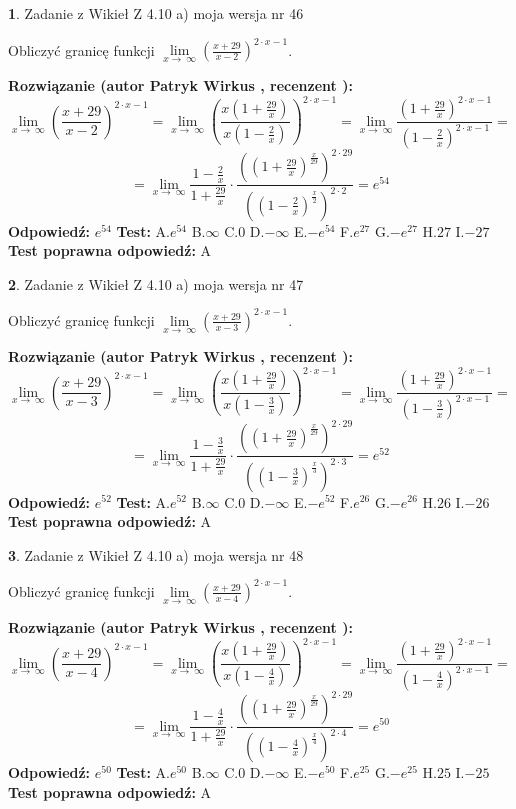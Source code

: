 \documentclass[12pt, a4paper]{article}
\theoremstyle{definition} %
\newtheorem{zad}{}
\newcommand{\zadStart}[1]{\begin{zad}#1\newline}
\newcommand{\zadStop}{\end{zad}}
\newcommand{\rozwStart}[2]{\noindent \textbf{Rozwiązanie (autor #1 , recenzent #2): }\newline}
\newcommand{\rozwStop}{\newline}
\newcommand{\odpStart}{\noindent \textbf{Odpowiedź:}\newline}
\newcommand{\odpStop}{\newline}
\newcommand{\testStart}{\noindent \textbf{Test:}\newline}
\newcommand{\testStop}{\newline}
\newcommand{\kluczStart}{\noindent \textbf{Test poprawna odpowiedź:}\newline}
\newcommand{\kluczStop}{\newline}
\begin{document}
\zadStart{Zadanie z Wikieł Z 4.10 a) moja wersja nr 46}

Obliczyć granicę funkcji  $\lim\limits_{x\to\ \infty}(\frac{x+29}{x-2})^{2\cdot x-1}$.
\zadStop
\rozwStart{Patryk Wirkus}{}
$$\lim\limits_{x\to\ \infty}(\frac{x+29}{x-2})^{2\cdot x-1} = \lim\limits_{x\to\ \infty}(\frac{x(1+\frac{29}{x})}{x(1-\frac{2}{x})})^{2\cdot x-1}=\lim\limits_{x\to\ \infty}\frac{(1+\frac{29}{x})^{2\cdot x-1}}{(1-\frac{2}{x})^{2\cdot x-1}}=$$
$$=\lim\limits_{x\to\ \infty}\frac{1-\frac{2}{x}}{1+\frac{29}{x}}\cdot\frac{((1+\frac{29}{x})^{\frac{x}{29}})^{2\cdot29}}{((1-\frac{2}{x})^{\frac{x}{2}})^{2\cdot2}}=e^{54}$$
\rozwStop
\odpStart
$e^{54}$
\odpStop
\testStart
A.$e^{54}$ B.$\infty$ C.$0$ D.$-\infty$ E.$-e^{54}$
F.$e^{27}$ G.$-e^{27}$
H.$27$
I.$-27$
\testStop
\kluczStart
A
\kluczStop



\zadStart{Zadanie z Wikieł Z 4.10 a) moja wersja nr 47}

Obliczyć granicę funkcji  $\lim\limits_{x\to\ \infty}(\frac{x+29}{x-3})^{2\cdot x-1}$.
\zadStop
\rozwStart{Patryk Wirkus}{}
$$\lim\limits_{x\to\ \infty}(\frac{x+29}{x-3})^{2\cdot x-1} = \lim\limits_{x\to\ \infty}(\frac{x(1+\frac{29}{x})}{x(1-\frac{3}{x})})^{2\cdot x-1}=\lim\limits_{x\to\ \infty}\frac{(1+\frac{29}{x})^{2\cdot x-1}}{(1-\frac{3}{x})^{2\cdot x-1}}=$$
$$=\lim\limits_{x\to\ \infty}\frac{1-\frac{3}{x}}{1+\frac{29}{x}}\cdot\frac{((1+\frac{29}{x})^{\frac{x}{29}})^{2\cdot29}}{((1-\frac{3}{x})^{\frac{x}{3}})^{2\cdot3}}=e^{52}$$
\rozwStop
\odpStart
$e^{52}$
\odpStop
\testStart
A.$e^{52}$ B.$\infty$ C.$0$ D.$-\infty$ E.$-e^{52}$
F.$e^{26}$ G.$-e^{26}$
H.$26$
I.$-26$
\testStop
\kluczStart
A
\kluczStop



\zadStart{Zadanie z Wikieł Z 4.10 a) moja wersja nr 48}

Obliczyć granicę funkcji  $\lim\limits_{x\to\ \infty}(\frac{x+29}{x-4})^{2\cdot x-1}$.
\zadStop
\rozwStart{Patryk Wirkus}{}
$$\lim\limits_{x\to\ \infty}(\frac{x+29}{x-4})^{2\cdot x-1} = \lim\limits_{x\to\ \infty}(\frac{x(1+\frac{29}{x})}{x(1-\frac{4}{x})})^{2\cdot x-1}=\lim\limits_{x\to\ \infty}\frac{(1+\frac{29}{x})^{2\cdot x-1}}{(1-\frac{4}{x})^{2\cdot x-1}}=$$
$$=\lim\limits_{x\to\ \infty}\frac{1-\frac{4}{x}}{1+\frac{29}{x}}\cdot\frac{((1+\frac{29}{x})^{\frac{x}{29}})^{2\cdot29}}{((1-\frac{4}{x})^{\frac{x}{4}})^{2\cdot4}}=e^{50}$$
\rozwStop
\odpStart
$e^{50}$
\odpStop
\testStart
A.$e^{50}$ B.$\infty$ C.$0$ D.$-\infty$ E.$-e^{50}$
F.$e^{25}$ G.$-e^{25}$
H.$25$
I.$-25$
\testStop
\kluczStart
A
\kluczStop
\end{document}
